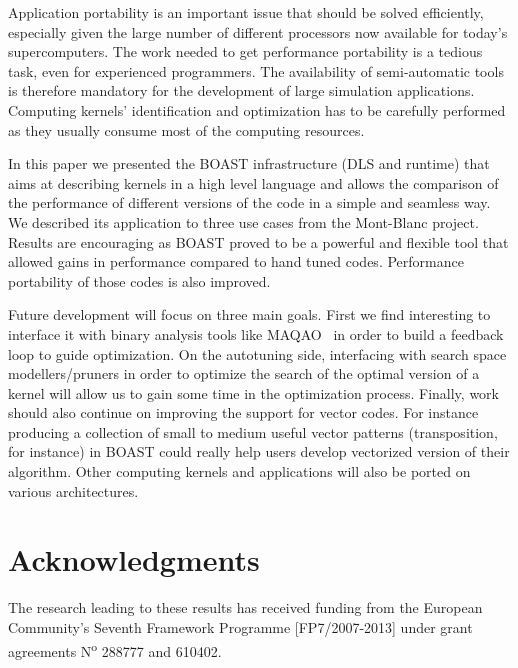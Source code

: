 \documentclass{IEEEtran}
\newcommand*{\Num}{N\textsuperscript{o}\xspace}
\begin{document}
Application portability is an important issue that should be solved efficiently, especially given the large number of different processors now
available for today's supercomputers. The work needed to get performance portability is a tedious task, even for experienced programmers. The
availability of semi-automatic tools is therefore mandatory for the development of large simulation applications. Computing kernels' identification
and optimization has to be carefully performed as they usually consume most of the computing resources. 

In this paper we presented the BOAST infrastructure (DLS and runtime) that aims at describing kernels in a high level language and allows the
comparison of the performance of different versions of the code in a simple and seamless way. We described its application to three use cases from the
Mont-Blanc project. Results are encouraging as BOAST proved to be a powerful and flexible tool that allowed gains in performance compared to hand
tuned codes. Performance portability of those codes is also improved.

Future development will focus on three main goals. First we find interesting to interface it with binary analysis tools like
MAQAO~\cite{djoudi2005exploring} in order to build a feedback loop to guide optimization. On the autotuning side, interfacing with search space
modellers/pruners in order to optimize the search of the optimal version of a kernel will allow us to gain some time in the optimization
process. Finally, work should also continue on improving the support for vector codes. For instance producing a collection of small to medium useful
vector patterns (transposition, for instance) in BOAST could really help users develop vectorized version of their algorithm. Other computing kernels
and applications will also be ported on various architectures.

\section*{Acknowledgments}

The research leading to these results has received funding from the European
Community's Seventh Framework Programme [FP7/2007-2013] under grant agreements
\Num 288777 and 610402.



\end{document}
